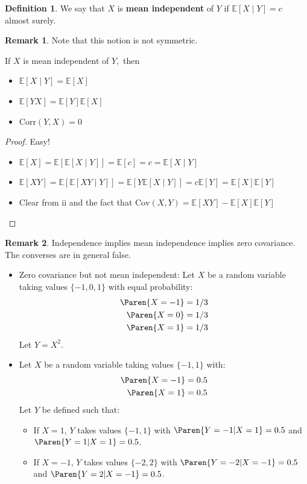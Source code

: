 \documentclass[10pt, oneside]{article}
\newcommand{\Cov}{\text{Cov}}
\newcommand{\Corr}{\text{Corr}}
\newcommand{\bbE}{\mathbb{E}}
\theoremstyle{definition}
\newtheorem{defn}{Definition}
\newtheorem{rem}{Remark}
\begin{document}
\begin{defn}
    We say that $X$ is \textbf{mean independent} of $Y$ if $\bbE[X \mid Y] = c$ almost surely. 
\end{defn}
\begin{rem}
    Note that this notion is not symmetric.
\end{rem}
\begin{lemma}
    If $X$ is mean independent of $Y,$ then
    \begin{itemize}
        \item $\bbE[X \mid Y] = \bbE[X]$
        \item $\bbE[YX] = \bbE[Y]\bbE[X]$
        \item $\Corr(Y,X) = 0$
    \end{itemize}
\end{lemma}
\begin{proof}
Easy!
    \begin{itemize}
        \item $\bbE[X] = \bbE[\bbE[X \mid Y]] = \bbE[c] = c = \bbE[X \mid Y]$
        \item $\bbE[XY] = \bbE[\bbE[XY \mid Y]] = \bbE[Y \bbE[X \mid Y]] = c\bbE[Y] = \bbE[X]\bbE[Y]$
        \item Clear from ii and the fact that $\Cov(X,Y) = \bbE[XY]-\bbE[X]\bbE[Y]$
    \end{itemize}
\end{proof}
\begin{rem}
    Independence implies mean independence implies zero covariance. The converses are in general false. 
    \begin{itemize}
        \item Zero covariance but not mean independent: Let $X$ be a random variable taking values $\{-1, 0, 1\}$ with equal probability:
\begin{align*}
    \Paren{X = -1} &= 1/3 \\
    \Paren{X = 0} &= 1/3 \\
    \Paren{X = 1} &= 1/3
\end{align*}
Let $Y = X^2$.
\item Let $X$ be a random variable taking values $\{-1, 1\}$ with:
\begin{align*}
    \Paren{X = -1} &= 0.5 \\
    \Paren{X = 1} &= 0.5
\end{align*}
Let $Y$ be defined such that:
\begin{itemize}
    \item If $X=1$, $Y$ takes values $\{-1, 1\}$ with $\Paren{Y=-1|X=1}=0.5$ and $\Paren{Y=1|X=1}=0.5$.
    \item If $X=-1$, $Y$ takes values $\{-2, 2\}$ with $\Paren{Y=-2|X=-1}=0.5$ and $\Paren{Y=2|X=-1}=0.5$.
\end{itemize}
    \end{itemize}
\end{rem}
\end{document}
